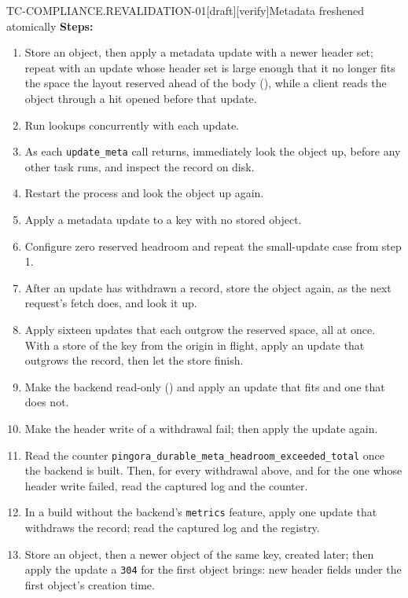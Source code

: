 \begin{requirement}{TC-COMPLIANCE.REVALIDATION-01}[draft][verify]{Metadata freshened atomically}
  \textbf{Steps:}
  \begin{enumerate}
    \item Store an object, then apply a metadata update with a newer header set;
      repeat with an update whose header set is large enough that it no longer
      fits the space the layout reserved ahead of the body
      (), while a client reads the object
      through a hit opened before that update.
    \item Run lookups concurrently with each update.
    \item As each \texttt{update\_meta} call returns, immediately look the
      object up, before any other task runs, and inspect the record on disk.
    \item Restart the process and look the object up again.
    \item Apply a metadata update to a key with no stored object.
    \item Configure zero reserved headroom and repeat the small-update case
      from step 1.
    \item After an update has withdrawn a record, store the object again, as
      the next request's fetch does, and look it up.
    \item Apply sixteen updates that each outgrow the reserved space, all at
      once. With a store of the key from the origin in flight, apply an
      update that outgrows the record, then let the store finish.
    \item Make the backend read-only () and
      apply an update that fits and one that does not.
    \item Make the header write of a withdrawal fail; then apply the update
      again.
    \item Read the counter
      \texttt{pingora\_durable\_meta\_headroom\_exceeded\_total} once the
      backend is built. Then, for every withdrawal above, and for the one
      whose header write failed, read the captured log and the counter.
    \item In a build without the backend's \texttt{metrics} feature, apply one
      update that withdraws the record; read the captured log and the
      registry.
    \item Store an object, then a newer object of the same key, created later;
      then apply the update a \texttt{304} for the first object brings: new
      header fields under the first object's creation time.
  \end{enumerate}


\end{requirement}
